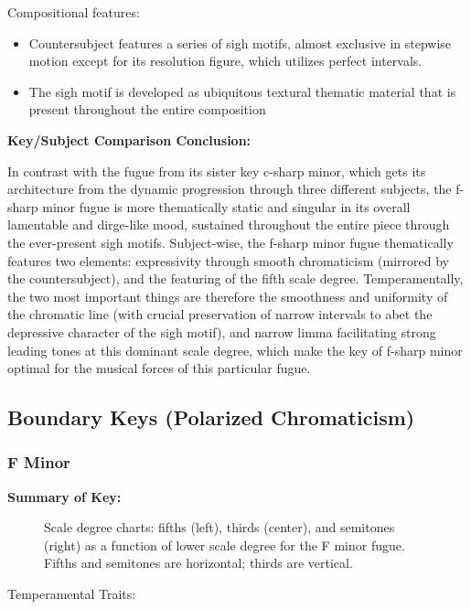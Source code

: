 Compositional features:

\begin{itemize}
\tightlist
\item
  Countersubject features a series of sigh motifs, almost exclusive in
  stepwise motion except for its resolution figure, which utilizes
  perfect intervals.
\item
  The sigh motif is developed as ubiquitous textural thematic material
  that is present throughout the entire composition
\end{itemize}

\textbf{Key/Subject Comparison Conclusion:}

In contrast with the fugue from its sister key c-sharp minor, which gets
its architecture from the dynamic progression through three different
subjects, the f-sharp minor fugue is more thematically static and
singular in its overall lamentable and dirge-like mood, sustained
throughout the entire piece through the ever-present sigh motifs.
Subject-wise, the f-sharp minor fugue thematically features two
elements: expressivity through smooth chromaticism (mirrored by the
countersubject), and the featuring of the fifth scale degree.
Temperamentally, the two most important things are therefore the
smoothness and uniformity of the chromatic line (with crucial
preservation of narrow intervals to abet the depressive character of the
sigh motif), and narrow limma facilitating strong leading tones at this
dominant scale degree, which make the key of f-sharp minor optimal for
the musical forces of this particular fugue.

    \subsection{Boundary Keys (Polarized
Chromaticism)}\label{boundary-keys-polarized-chromaticism}

    \subsubsection{F Minor}\label{f-minor}

\textbf{Summary of Key:}



\begin{figure}[H]
\vspace{1.5em}
    \centering
    \caption[Scale degree charts: fifths, thirds, and semitones as a function of lower scale degree for the F minor fugue. ]{Scale degree charts: fifths (left), thirds (center), and semitones (right) as a function of lower scale degree for the F minor fugue. Fifths and semitones are horizontal; thirds are vertical.}
\end{figure}    Temperamental Traits:

